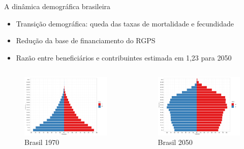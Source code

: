 \documentclass{beamer}
\begin{document}
\begin{frame}{A dinâmica demográfica brasileira}
	\begin{itemize}
		\item{Transição demográfica: queda das taxas de mortalidade e fecundidade}
		\item{Redução da base de financiamento do RGPS}
		\item{Razão entre beneficiários e contribuintes estimada em 1,23 para 2050}
	\end{itemize}
	\begin{columns}[c]
	\column{6cm}
	\begin{figure}
		\caption{Brasil 1970}
		\includegraphics[width=\textwidth]{Graphs/1970.pdf}
	\end{figure}
	\column{6cm}
	\begin{figure}
		\caption{Brasil 2050}
		\includegraphics[width=\textwidth]{Graphs/2050.pdf}
	\end{figure}
	\end{columns}
\end{frame}
\end{document}
